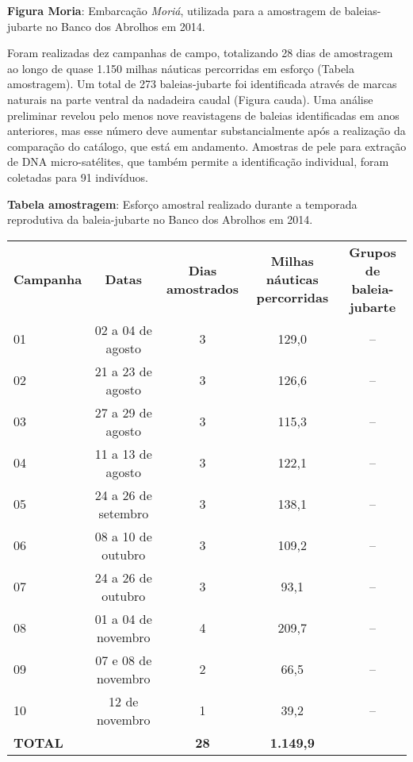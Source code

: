 \textbf{Figura Moria}: Embarcação \textit{Moriá}, utilizada para a amostragem de baleias-jubarte no Banco dos Abrolhos em 2014.

Foram realizadas dez campanhas de campo, totalizando 28 dias de amostragem ao longo de quase 1.150 milhas náuticas percorridas em esforço (Tabela amostragem). Um total de 273 baleias-jubarte foi identificada através de marcas naturais na parte ventral da nadadeira caudal (Figura cauda). Uma análise preliminar revelou pelo menos nove reavistagens de baleias identificadas em anos anteriores, mas esse número deve aumentar substancialmente após a realização da comparação do catálogo, que está em andamento. Amostras de pele para extração de DNA micro-satélites, que também permite a identificação individual, foram coletadas para 91 indivíduos.

\textbf{Tabela amostragem}: Esforço amostral realizado durante a temporada reprodutiva da baleia-jubarte no Banco dos Abrolhos em 2014.  
\begin{tabular}{lcccc}  
\textbf{Campanha} & \textbf{Datas} & \textbf{Dias amostrados} & \textbf{Milhas náuticas percorridas} & \textbf{Grupos de baleia-jubarte} \\
01 & 02 a 04 de agosto & 3 & 129,0 & -- \\
02 & 21 a 23 de agosto & 3 & 126,6 & -- \\
03 & 27 a 29 de agosto & 3 & 115,3 & -- \\
04 & 11 a 13 de agosto & 3 & 122,1 & -- \\
05 & 24 a 26 de setembro & 3 & 138,1 & -- \\
06 & 08 a 10 de outubro & 3 & 109,2 & -- \\
07 & 24 a 26 de outubro & 3 & 93,1 & -- \\
08 & 01 a 04 de novembro & 4 & 209,7 & -- \\
09 & 07 e 08 de novembro & 2 & 66,5 & -- \\
10 & 12 de novembro & 1 & 39,2 & -- \\
\textbf{TOTAL} & & \textbf{28} & \textbf{1.149,9} & \\
\end{tabular}    
